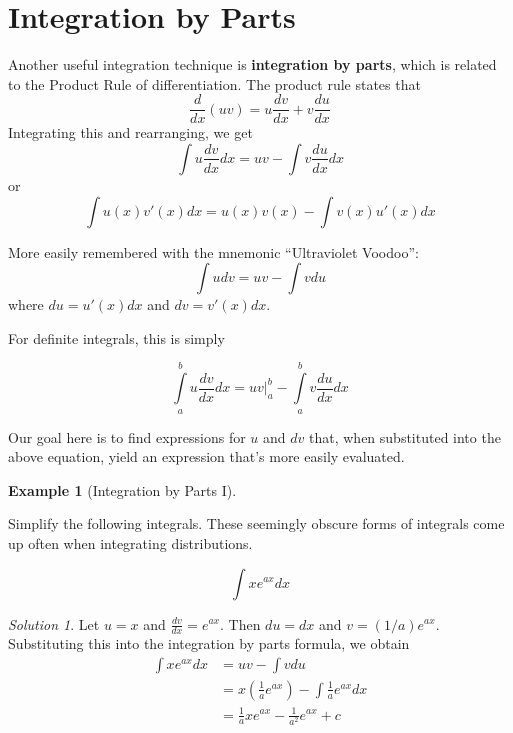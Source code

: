 \documentclass[
  letterpaper,
]{book}
\theoremstyle{definition}
\theoremstyle{definition}
\newtheorem{example}{Example}[chapter]
\theoremstyle{plain}
\theoremstyle{definition}
\theoremstyle{plain}
\theoremstyle{plain}
\theoremstyle{remark}
\newtheorem*{solution}{Solution}
\begin{document}
\hypertarget{integration-by-parts}{%
\section{Integration by Parts}\label{integration-by-parts}}

Another useful integration technique is \textbf{integration by parts},
which is related to the Product Rule of differentiation. The product
rule states that \[\frac{d}{dx}(uv)=u\frac{dv}{dx}+v\frac{du}{dx}\]
Integrating this and rearranging, we get
\[\int u\frac{dv}{dx}dx= u v - \int v \frac{du}{dx}dx\] or
\[\int u(x) v'(x)dx=u(x)v(x) - \int v(x)u'(x)dx\]

More easily remembered with the mnemonic ``Ultraviolet Voodoo'':
\[\int u dv = u v - \int v du\] where \(du=u'(x)dx\) and \(dv=v'(x)dx\).

For definite integrals, this is simply

\[\int\limits_a^b u\frac{dv}{dx}dx = \left. u v \right|_a^b - \int\limits_a^b v \frac{du}{dx}dx\]

Our goal here is to find expressions for \(u\) and \(dv\) that, when
substituted into the above equation, yield an expression that's more
easily evaluated.

\leavevmode{}%
\begin{example}[Integration by Parts I]\label{exm-}

Simplify the following integrals. These seemingly obscure forms of
integrals come up often when integrating distributions.

\[\int x e^{ax} dx\]

\end{example}

\begin{solution}

Let \(u=x\) and \(\frac{dv}{dx} = e^{ax}\). Then \(du=dx\) and
\(v=(1/a)e^{ax}\). Substituting this into the integration by parts
formula, we obtain\\
\begin{align*}
\int x e^{ax} dx &= u v - \int v du\nonumber\\
                &=x\left( \frac{1}{a}e^{ax}\right) -\int\frac{1}{a}e^{ax}dx\nonumber\\
                &=\frac{1}{a}xe^{ax}-\frac{1}{a^2}e^{ax}+c\nonumber
\end{align*}

\end{solution}
\end{document}
